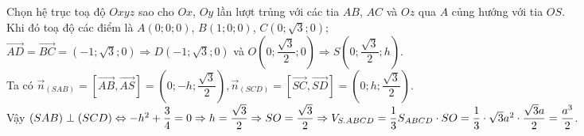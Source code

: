 \begin{ex}
{\begin{itemize}
	Chọn hệ trục toạ độ $O x y z$ sao cho $O x$, $O y$ lần lượt trủng với các tia $A B$, $A C$ và $O z$ qua $A$ củng hướng với tia $O S$.\\
	Khi đó toạ độ các điểm là $A(0 ; 0 ; 0)$, $B(1 ; 0 ; 0)$, $C(0 ; \sqrt{3} ; 0)$;\\ $\overrightarrow{A D}=\overrightarrow{B C}=(-1 ; \sqrt{3} ; 0) \Rightarrow D(-1 ; \sqrt{3} ; 0)$ và $O\left(0 ; \dfrac{\sqrt{3}}{2} ; 0\right) \Rightarrow S\left(0 ; \dfrac{\sqrt{3}}{2} ; h\right)$.\\
	Ta có $\overrightarrow{n}_{(S A B)}=[\overrightarrow{A B}, \overrightarrow{A S}]=\left(0 ;-h ; \dfrac{\sqrt{3}}{2}\right), \overrightarrow{n}_{(S C D)}=[\overrightarrow{S C}, \overrightarrow{S D}]=\left(0 ; h ; \dfrac{\sqrt{3}}{2}\right)$.\\
	Vậy $(S A B) \perp(S C D) \Leftrightarrow-h^2+\dfrac{3}{4}=0 \Rightarrow h=\dfrac{\sqrt{3}}{2} \Rightarrow S O=\dfrac{\sqrt{3}}{2}\\ \Rightarrow V_{S.A B C D}=\dfrac{1}{3} S_{A B C D} \cdot S O=\dfrac{1}{3} \cdot \sqrt{3} a^2 \cdot \dfrac{\sqrt{3} a}{2}=\dfrac{a^3}{2}$.
	\end{itemize}
	}
\end{ex}
